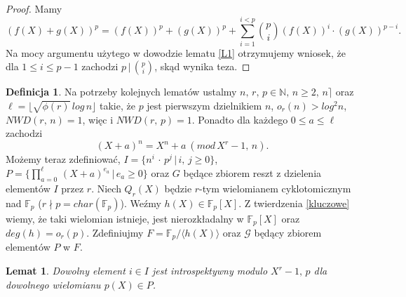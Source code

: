 \documentclass[declaration,shortabstract]{iithesis}
\theoremstyle{definition}
\newtheorem{definition}{Definicja}
\theoremstyle{remark} \newtheorem{observation}{Obserwacja}
\theoremstyle{plain} \newtheorem{theorem}{Twierdzenie}
\theoremstyle{plain} \newtheorem{lemma}{Lemat}
\theoremstyle{remark} \newtheorem*{remark*}{Uwaga}
\theoremstyle{reminder} \newtheorem*{reminder*}{Przypomnienie}
\begin{document}
\begin{proof}
	Mamy \[(f(X) + g(X))^p = (f(X))^p + (g(X))^p + \sum_{i=1}^{i < p}{p \choose i}(f(X))^i\cdot(g(X))^{p - i}.\] Na mocy argumentu użytego w dowodzie lematu \ref{L1} otrzymujemy wniosek, że dla $1 \leq i \leq p - 1$ zachodzi $p \, | \, {p \choose i}$, skąd wynika teza.
\end{proof}

\begin{definition}\label{def}
    Na potrzeby kolejnych lematów ustalmy $n, \, r, \, p \in \mathbb{N}, \, n \geq 2, 
    \, n \rceil$ oraz $\ell = \lfloor\sqrt{\phi (r)} \, log \, n \rfloor$ takie, że $p$ jest pierwszym dzielnikiem $n$, $o_r(n) > log^2n$, $NWD(r, \, n) = 1$, więc i $NWD(r, \, p) = 1$. Ponadto dla każdego $0 \leq a \leq \ell$ zachodzi \[(X + a)^n = X^n + a \: (mod \, X^r - 1, \, n).\] Możemy teraz zdefiniować, $I = \{n^i \, \cdot \, p^j \, | \, i, \, j \geq 0\}$, $P = \{\prod_{a=0}^{\ell} \, (X + a)^{e_a} \, | \, e_a \geq 0\}$ oraz $G$ będące zbiorem reszt z dzielenia elementów $I$ przez $r$. Niech $Q_r(X)$ będzie $r$-tym wielomianem cyklotomicznym nad $\mathbb{F}_p$ ($ r \nmid p = char(\mathbb{F}_p)$). Weźmy $h(X) \in \mathbb{F}_p[X]$. Z twierdzenia \ref{kluczowe} wiemy, że taki wielomian istnieje, jest nierozkładalny w $\mathbb{F}_p[X]$ oraz $deg(h) = o_r(p)$. Zdefiniujmy $F = \mathbb{F}_p / \langle h(X) \rangle$ oraz $\mathcal{G}$ będący zbiorem elementów $P$ w $F$.
\end{definition}

\begin{lemma}\label{intro}
	Dowolny element $i \in I$ jest introspektywny modulo $X^r - 1, \, p$ dla dowolnego wielomianu $p(X) \in P$.
\end{lemma}
	
\end{document}

